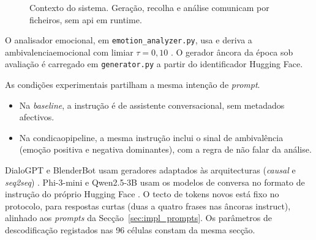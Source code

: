 \begin{figure}[ht]
\centering
{}
\caption[Contexto do sistema.]{Contexto do sistema. Geração, recolha e análise comunicam por ficheiros, sem \acrshort{api} em runtime.}
\label{fig:sistema_contexto}
\end{figure}

O analisador emocional, em \texttt{emotion\_analyzer.py}, usa  e deriva a \gls{ambivalenciaemocional} com limiar \(\tau = 0{,}10\) \parencite{Demszky2020GoEmotions}. O gerador âncora da época sob avaliação é carregado em \texttt{generator.py} a partir do identificador Hugging Face.

As condições experimentais partilham a mesma intenção de \textit{prompt}.
\begin{itemize}
 \item Na \textit{baseline}, a instrução é de assistente conversacional, sem metadados afectivos.
 \item Na \gls{condicaopipeline}, a mesma instrução inclui o sinal de ambivalência (emoção positiva e negativa dominantes), com a regra de não falar da análise.
\end{itemize}

DialoGPT e BlenderBot usam geradores adaptados às arquitecturas (\textit{causal} e \textit{seq2seq}) \parencite{Zhang2020DialoGPT, Roller2021BlenderBot}. Phi-3-mini e Qwen2.5-3B usam os modelos de conversa no formato de instrução do próprio Hugging Face \parencite{Abdin2024Phi3, Yang2025Qwen25}. O tecto de tokens novos está fixo no protocolo, para respostas curtas (duas a quatro frases nas âncoras instruct), alinhado aos \textit{prompts} da Secção~\ref{sec:impl_prompts}. Os parâmetros de descodificação registados nas 96 células constam da mesma secção.

